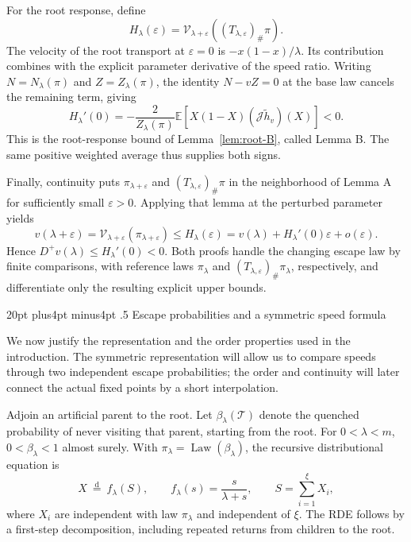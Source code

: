 \documentclass[11pt,reqno]{amsart}
\makeatletter
\def\section{\@startsection{section}{1}{0pt}%
  {20pt plus4pt minus4pt}
  {.5\linespacing}
  {\normalfont\bfseries}}
\theoremstyle{plain}
\theoremstyle{definition}
\theoremstyle{remark}
\numberwithin{equation}{section}
\newcommand{\E}{\mathbb E}
\newcommand{\Law}{\operatorname{Law}}
\newcommand{\Dplus}{D^{+}}
\newcommand{\cJ}{\mathcal J}
\makeatother
\begin{document}
For the root response, define
\[
 H_\lambda(\varepsilon)
 =\mathcal V_{\lambda+\varepsilon}
       ((T_{\lambda,\varepsilon})_\#\pi).
\]
The velocity of the root transport at $\varepsilon=0$ is
$-x(1-x)/\lambda$. Its contribution combines with the explicit
parameter derivative of the speed ratio. Writing $N=N_\lambda(\pi)$
and $Z=Z_\lambda(\pi)$, the identity $N-vZ=0$ at the base law
cancels the remaining term, giving
\[
 H_\lambda'(0)
 =-\frac{2}{Z_\lambda(\pi)}
       \E[X(1-X)(\cJ\widetilde h_v)(X)]<0.
\]
This is the root-response bound of Lemma~\ref{lem:root-B}, called
Lemma B. The same positive weighted average thus supplies both signs.

Finally, continuity puts $\pi_{\lambda+\varepsilon}$ and
$(T_{\lambda,\varepsilon})_\#\pi$ in the neighborhood of Lemma A for
sufficiently small $\varepsilon>0$. Applying that lemma at the
perturbed parameter yields
\[
 v(\lambda+\varepsilon)
 =\mathcal V_{\lambda+\varepsilon}(\pi_{\lambda+\varepsilon})
 \le H_\lambda(\varepsilon)
 =v(\lambda)+H_\lambda'(0)\varepsilon+o(\varepsilon).
\]
Hence $\Dplus v(\lambda)\le H_\lambda'(0)<0$. Both proofs handle the
changing escape law by finite comparisons, with reference laws
$\pi_\lambda$ and $(T_{\lambda,\varepsilon})_\#\pi_\lambda$,
respectively, and differentiate only the resulting explicit upper bounds.

\section{Escape probabilities and a symmetric speed formula}\label{sec:reduction}

We now justify the representation and the order properties used in the
introduction. The symmetric representation will allow us to compare speeds
through two independent escape probabilities; the order and continuity
will later connect the actual fixed points by a short interpolation.

Adjoin an artificial parent to the root. Let $\beta_\lambda(\mathcal{T})$ denote the
quenched probability of never visiting that parent, starting from the root.
For $0<\lambda<m$, $0<\beta_\lambda<1$ almost surely. With
$\pi_\lambda=\Law(\beta_\lambda)$, the recursive distributional equation is
\begin{equation}\label{eq:rde}
 X\ \overset{\mathrm d}=\ f_\lambda(S),\qquad
 f_\lambda(s)=\frac{s}{\lambda+s},\qquad
 S=\sum_{i=1}^{\xi}X_i,
\end{equation}
where $X_i$ are independent with law $\pi_\lambda$ and independent of $\xi$.
The RDE follows by a first-step decomposition, including repeated returns
from children to the root.
\end{document}
